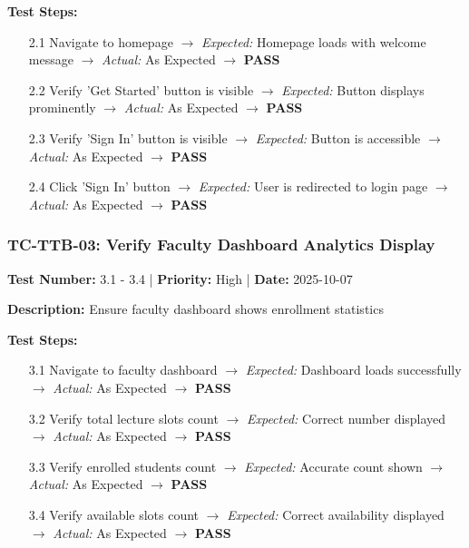 \textbf{Test Steps:}
\begin{enumerate}[leftmargin=*]
    \item[2.1] Navigate to homepage $\rightarrow$ \textit{Expected:} Homepage loads with welcome message $\rightarrow$ \textit{Actual:} As Expected $\rightarrow$ \textbf{PASS}
    \item[2.2] Verify 'Get Started' button is visible $\rightarrow$ \textit{Expected:} Button displays prominently $\rightarrow$ \textit{Actual:} As Expected $\rightarrow$ \textbf{PASS}
    \item[2.3] Verify 'Sign In' button is visible $\rightarrow$ \textit{Expected:} Button is accessible $\rightarrow$ \textit{Actual:} As Expected $\rightarrow$ \textbf{PASS}
    \item[2.4] Click 'Sign In' button $\rightarrow$ \textit{Expected:} User is redirected to login page $\rightarrow$ \textit{Actual:} As Expected $\rightarrow$ \textbf{PASS}
\end{enumerate}

\subsubsection{TC-TTB-03: Verify Faculty Dashboard Analytics Display}

\textbf{Test Number:} 3.1 - 3.4 | \textbf{Priority:} High | \textbf{Date:} 2025-10-07

\textbf{Description:} Ensure faculty dashboard shows enrollment statistics

\textbf{Test Steps:}
\begin{enumerate}[leftmargin=*]
    \item[3.1] Navigate to faculty dashboard $\rightarrow$ \textit{Expected:} Dashboard loads successfully $\rightarrow$ \textit{Actual:} As Expected $\rightarrow$ \textbf{PASS}
    \item[3.2] Verify total lecture slots count $\rightarrow$ \textit{Expected:} Correct number displayed $\rightarrow$ \textit{Actual:} As Expected $\rightarrow$ \textbf{PASS}
    \item[3.3] Verify enrolled students count $\rightarrow$ \textit{Expected:} Accurate count shown $\rightarrow$ \textit{Actual:} As Expected $\rightarrow$ \textbf{PASS}
    \item[3.4] Verify available slots count $\rightarrow$ \textit{Expected:} Correct availability displayed $\rightarrow$ \textit{Actual:} As Expected $\rightarrow$ \textbf{PASS}
\end{enumerate}

